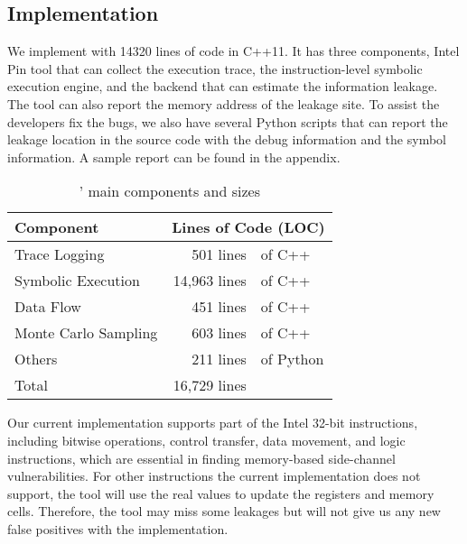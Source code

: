 \subsection{Implementation}
We implement \tool{} with 14320 lines of code in C++11. 
It has three components, Intel
Pin tool that can collect the execution trace, 
the instruction-level symbolic execution
engine, and the backend that can estimate the information leakage. 
The tool can also report the memory address of the leakage site. 
To assist the developers fix the bugs, we also have several Python 
scripts that can report the leakage location in the source code with the 
debug information and the symbol information. A sample report can be found
 in the appendix.

\begin{table}[h]
    \centering
    \caption{\tool{}' main components and sizes}
    \begin{tabular}{lr@{~}@{}l}
    \hline
    Component                            & \multicolumn{2}{c}{Lines of Code (LOC)}    \\ \hline
    Trace Logging                        & 501 lines &of C++       \\ 
    Symbolic Execution                   & 14,963 lines &of C++    \\ 
    Data Flow                            & 451 lines &of C++       \\
    Monte Carlo Sampling                 & 603 lines &of C++       \\ 
    Others                               & 211 lines &of Python    \\ \hline
    Total    & 16,729 lines & \\\hline
    \end{tabular}
\end{table}

Our current implementation supports part of the Intel 32-bit instructions, 
including bitwise operations, control transfer, data movement, and logic 
instructions, which are essential in finding memory-based side-channel vulnerabilities. For other 
instructions the current implementation does not support, 
the tool will use the real values to update the registers and memory cells.
Therefore, the tool may miss some leakages but will not give us any new
false positives with the implementation.
